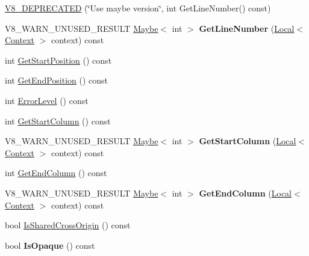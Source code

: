 \begin{DoxyCompactItemize}
\mbox{\hyperlink{classv8_1_1Message_acccd9c74f89e9951037c2e602703b57d}{V8\+\_\+\+D\+E\+P\+R\+E\+C\+A\+T\+ED}} (\char`\"{}Use maybe version\char`\"{}, int Get\+Line\+Number() const)
\item 
\mbox{\label{classv8_1_1Message_a14934ab71695e916dfacb31b932e21d7}} 
V8\+\_\+\+W\+A\+R\+N\+\_\+\+U\+N\+U\+S\+E\+D\+\_\+\+R\+E\+S\+U\+LT \mbox{\hyperlink{classv8_1_1Maybe}{Maybe}}$<$ int $>$ {\bfseries Get\+Line\+Number} (\mbox{\hyperlink{classv8_1_1Local}{Local}}$<$ \mbox{\hyperlink{classv8_1_1Context}{Context}} $>$ context) const
\item 
int \mbox{\hyperlink{classv8_1_1Message_a8c32ad25c164ecec1bae0293449589f4}{Get\+Start\+Position}} () const
\item 
int \mbox{\hyperlink{classv8_1_1Message_a9a6c55ffea2eb6841d67afec40300641}{Get\+End\+Position}} () const
\item 
int \mbox{\hyperlink{classv8_1_1Message_a91bb679f695d82c2c2228645ca4497c6}{Error\+Level}} () const
\item 
int \mbox{\hyperlink{classv8_1_1Message_a3be9714cc977899bc1c935b00a140969}{Get\+Start\+Column}} () const
\item 
\mbox{\label{classv8_1_1Message_a6051fbca9ed6bee7bb5726363de20a5a}} 
V8\+\_\+\+W\+A\+R\+N\+\_\+\+U\+N\+U\+S\+E\+D\+\_\+\+R\+E\+S\+U\+LT \mbox{\hyperlink{classv8_1_1Maybe}{Maybe}}$<$ int $>$ {\bfseries Get\+Start\+Column} (\mbox{\hyperlink{classv8_1_1Local}{Local}}$<$ \mbox{\hyperlink{classv8_1_1Context}{Context}} $>$ context) const
\item 
int \mbox{\hyperlink{classv8_1_1Message_ae188ca2457adbb3628681782bc757dc8}{Get\+End\+Column}} () const
\item 
\mbox{\label{classv8_1_1Message_a258b25b3a4f87922b0bbe4e388be6a1f}} 
V8\+\_\+\+W\+A\+R\+N\+\_\+\+U\+N\+U\+S\+E\+D\+\_\+\+R\+E\+S\+U\+LT \mbox{\hyperlink{classv8_1_1Maybe}{Maybe}}$<$ int $>$ {\bfseries Get\+End\+Column} (\mbox{\hyperlink{classv8_1_1Local}{Local}}$<$ \mbox{\hyperlink{classv8_1_1Context}{Context}} $>$ context) const
\item 
bool \mbox{\hyperlink{classv8_1_1Message_a60e48ec814c324c443043dfaf366590a}{Is\+Shared\+Cross\+Origin}} () const
\item 
\mbox{\label{classv8_1_1Message_adc719181a3b29658bb250c6f27bf60d8}} 
bool {\bfseries Is\+Opaque} () const
\end{DoxyCompactItemize}
